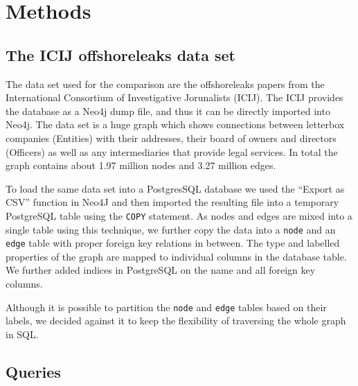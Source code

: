 \documentclass[11pt, a4paper,oneside,chapterprefix=false]{scrbook}
\begin{document}
\chapter{Methods} \label{chp:methods}


\section{The ICIJ offshoreleaks data set} \label{sec:dataset}

The data set used for the comparison are the offshoreleaks papers \cite{offshoreleaks} from the International Consortium of Investigative Jorunalists (ICIJ).
The ICIJ provides the database as a Neo4j dump file, and thus it can be directly imported into Neo4j.
The data set is a huge graph which shows connections between letterbox companies (Entities) with their addresses, their board of owners and directors (Officers) as well as any intermediaries that provide legal services. In total the graph contains about  1.97 million nodes and 3.27 million edges.

To load the same data set into a PostgresSQL database we used the ``Export as CSV'' function in Neo4J and then imported the resulting file into a temporary PostgreSQL table using the \lstinline{COPY} statement.
As nodes and edges are mixed into a single table using this technique, we further copy the data into a \lstinline{node} and an \lstinline{edge} table with proper foreign key relations in between.
The type and labelled properties of the graph are mapped to individual columns in the database table.
We further added indices in PostgreSQL on the name and all foreign key columns.

Although it is possible to partition the \lstinline{node} and \lstinline{edge} tables based on their labels, we decided against it to keep the flexibility of traversing the whole graph in SQL.

\section{Queries} \label{sec:benchmark}
\end{document}
